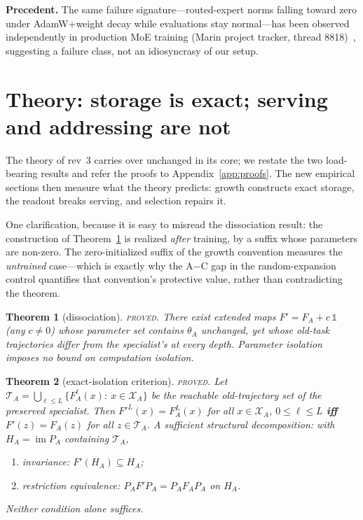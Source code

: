 \documentclass[11pt]{article}
\newtheorem{theorem}{Theorem}
\theoremstyle{definition}\newtheorem{definition}{Definition}
\theoremstyle{remark}\newtheorem{remark}{Remark}
\newcommand{\Xa}{\mathcal{X}_A}
\newcommand{\TA}{\mathcal{T}_A}
\begin{document}
\textbf{Precedent.} The same failure signature---routed-expert norms falling toward zero
under AdamW+weight decay while evaluations stay normal---has been observed independently in
production MoE training (Marin project tracker, thread 8818)~\cite{marin}, suggesting a failure class,
not an idiosyncrasy of our setup.

\section{Theory: storage is exact; serving and addressing are not}
\label{sec:theory}

The theory of rev~3 carries over unchanged in its core; we restate the two load-bearing
results and refer the proofs to Appendix~\ref{app:proofs}. The new empirical sections then
measure what the theory predicts: growth constructs exact storage, the readout breaks
serving, and selection repairs it.

One clarification, because it is easy to misread the dissociation result: the construction
of Theorem~\ref{thm:dissoc} is realized \emph{after} training, by a suffix whose parameters
are non-zero. The zero-initialized suffix of the growth convention measures the
\emph{untrained} case---which is exactly why the A$-$C gap in the random-expansion control
quantifies that convention's protective value, rather than contradicting the theorem.

\begin{theorem}[dissociation]\label{thm:dissoc}
\textsc{proved.} There exist extended maps $F'=F_A+c\,\mathbb{1}$ (any $c\neq0$) whose
parameter set contains $\theta_A$ unchanged, yet whose old-task trajectories differ from the
specialist's at every depth. Parameter isolation imposes no bound on computation isolation.
\end{theorem}

\begin{theorem}[exact-isolation criterion]\label{thm:criterion}
\textsc{proved.} Let $\TA=\bigcup_{\ell\le L}\{F_A^\ell(x):\ x\in\Xa\}$ be the reachable
old-trajectory set of the preserved specialist. Then
$F'^L(x)=F_A^L(x)$ for all $x\in\Xa$, $0\le\ell\le L$
\;\textbf{iff}\;
$F'(z)=F_A(z)$ for all $z\in\TA$.
A sufficient structural decomposition: with $H_A=\operatorname{im}P_A$ containing $\TA$,
\begin{enumerate}
\item[(C1)] \emph{invariance}: $F'(H_A)\subseteq H_A$;
\item[(C2)] \emph{restriction equivalence}: $P_AF'P_A = P_AF_AP_A$ on $H_A$.
\end{enumerate}
Neither condition alone suffices.
\end{theorem}
\end{document}
